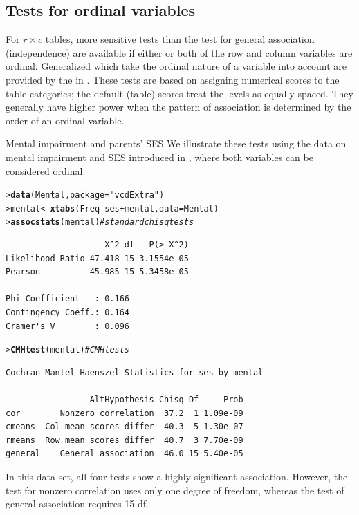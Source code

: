 \documentclass[10pt,krantz2]{krantz}\usepackage[]{graphicx}\usepackage[]{color}
\makeatletter
\newcommand{\hlstr}[1]{\textcolor[rgb]{0.192,0.494,0.8}{#1}}%
\newcommand{\hlcom}[1]{\textcolor[rgb]{0.678,0.584,0.686}{\textit{#1}}}%
\newcommand{\hlopt}[1]{\textcolor[rgb]{0,0,0}{#1}}%
\newcommand{\hlstd}[1]{\textcolor[rgb]{0.345,0.345,0.345}{#1}}%
\newcommand{\hlkwb}[1]{\textcolor[rgb]{0.69,0.353,0.396}{#1}}%
\newcommand{\hlkwc}[1]{\textcolor[rgb]{0.333,0.667,0.333}{#1}}%
\newcommand{\hlkwd}[1]{\textcolor[rgb]{0.737,0.353,0.396}{\textbf{#1}}}%
\newenvironment{kframe}{%
 \def\at@end@of@kframe{}%
 \ifinner\ifhmode%
  \def\at@end@of@kframe{\end{minipage}}%
  \begin{minipage}{\columnwidth}%
 \fi\fi%
 \def\FrameCommand##1{\hskip\@totalleftmargin \hskip-\fboxsep
 \colorbox{shadecolor}{##1}\hskip-\fboxsep
     \hskip-\linewidth \hskip-\@totalleftmargin \hskip\columnwidth}%
 \MakeFramed {\advance\hsize-\width
   \@totalleftmargin\z@ \linewidth\hsize
   \@setminipage}}%
 {\par\unskip\endMakeFramed%
 \at@end@of@kframe}
\newenvironment{knitrout}{}{} %
\renewenvironment{knitrout}{\small\renewcommand{\baselinestretch}{.85}}{} %
\makeatother
\begin{document}
\subsection{Tests for ordinal variables}\label{sec:ordinaltests}

For \(r \times  c\) tables, more sensitive tests
than the test for general association (independence)
are available if
either or both of the row and column variables are
ordinal. Generalized 
\citep{Landis-etal:1978}
which take the ordinal nature of a variable into
account are provided by the  in .
These tests are based on assigning numerical scores to
the table categories;  the default (table) scores treat the levels as
equally spaced.  They generally have higher power when the pattern of
association is determined by the order of an ordinal variable.

\begin{Example}[mental2]{Mental impairment and parents' SES}
We illustrate these tests using the data on mental impairment and SES
introduced in , where both variables can be considered ordinal.
\begin{knitrout}
\color{fgcolor}\begin{kframe}
\begin{alltt}
\hlstd{> }\hlkwd{data}\hlstd{(Mental,} \hlkwc{package}\hlstd{=}\hlstr{"vcdExtra"}\hlstd{)}
\hlstd{> }\hlstd{mental} \hlkwb{<-} \hlkwd{xtabs}\hlstd{(Freq} \hlopt{~} \hlstd{ses} \hlopt{+} \hlstd{mental,} \hlkwc{data} \hlstd{= Mental)}
\hlstd{> }\hlkwd{assocstats}\hlstd{(mental)}    \hlcom{# standard chisq tests}
\end{alltt}
\begin{verbatim}
                    X^2 df   P(> X^2)
Likelihood Ratio 47.418 15 3.1554e-05
Pearson          45.985 15 5.3458e-05

Phi-Coefficient   : 0.166 
Contingency Coeff.: 0.164 
Cramer's V        : 0.096 
\end{verbatim}
\begin{alltt}
\hlstd{> }\hlkwd{CMHtest}\hlstd{(mental)}       \hlcom{# CMH tests}
\end{alltt}
\begin{verbatim}
Cochran-Mantel-Haenszel Statistics for ses by mental 

                 AltHypothesis Chisq Df     Prob
cor        Nonzero correlation  37.2  1 1.09e-09
cmeans  Col mean scores differ  40.3  5 1.30e-07
rmeans  Row mean scores differ  40.7  3 7.70e-09
general    General association  46.0 15 5.40e-05
\end{verbatim}
\end{kframe}
\end{knitrout}
In this data set, all four tests show a highly significant association.
However, the  test for nonzero correlation uses only one
degree of freedom, whereas the test of general association requires
15 df.
\end{Example}
\end{document}

